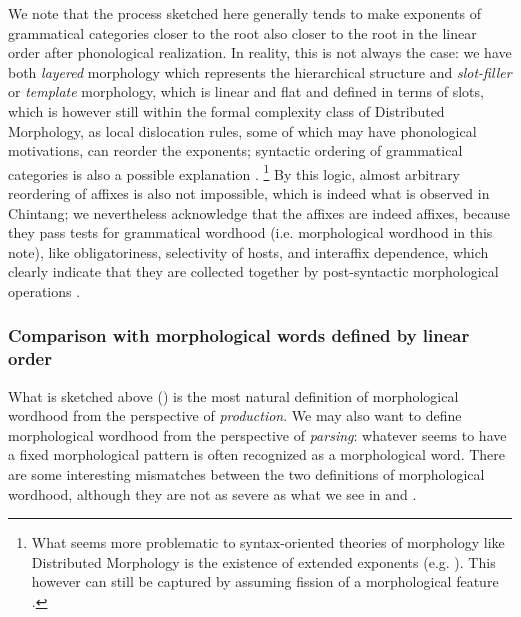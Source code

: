 \documentclass[a4paper, oneside, scheme=plain, 12pt]{article}
\begin{document}
We note that the process sketched here generally tends to 
make exponents of grammatical categories closer to the root also closer to the root
in the linear order after phonological realization.
In reality, this is not always the case:
we have both \emph{layered} morphology which represents the hierarchical structure
and \emph{slot-filler} or \emph{template} morphology, which is linear and flat and defined in terms of slots,
which is however still within the formal complexity class of Distributed Morphology,
as local dislocation rules, some of which may have phonological motivations,
can reorder the exponents;
syntactic ordering of grammatical categories is also a possible explanation
\citep{bye2020morpheme}.%
\footnote{
    What seems more problematic to syntax-oriented theories of morphology like Distributed Morphology
    is the existence of extended exponents (e.g. \citealt{bickel2007free}).
    This however can still be captured by assuming fission of a morphological feature \citep{bobaljik2017distributed}.
}
By this logic, almost arbitrary reordering of affixes is also not impossible,
which is indeed what is observed in Chintang;
we nevertheless acknowledge that the affixes are indeed affixes,
because they pass tests for grammatical wordhood (i.e. morphological wordhood in this note),
like obligatoriness, selectivity of hosts, and interaffix dependence,
which clearly indicate that they are collected together by post-syntactic morphological operations \citep{bickel2007free}.

\subsubsection{Comparison with morphological words defined by linear order}\label{sec:morphological-wordhood-linear}

What is sketched above ()
is the most natural definition of morphological wordhood from the perspective of \emph{production}.
We may also want to define morphological wordhood from the perspective of \emph{parsing}:
whatever seems to have a fixed morphological pattern
is often recognized as a morphological word.
There are some interesting mismatches between the two definitions of morphological wordhood,
although they are not as severe as what we see in 
 and .
\end{document}
